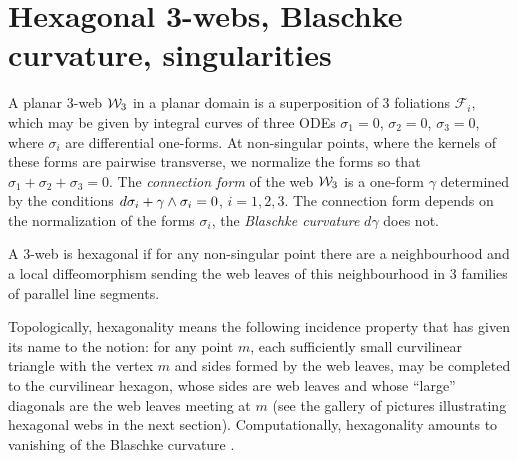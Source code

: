 \documentclass[11pt]{article}
\numberwithin{equation}{section}
\numberwithin{equation}{section}
\begin{document}
\section{Hexagonal 3-webs, Blaschke curvature, singularities}
A planar 3-web ${\cal W}_3$ in a planar domain is a superposition of 3 foliations $\mathcal{F}_i$, which may be given by integral curves of three ODEs
$
\sigma _1=0$, $\sigma _2=0$, $ \sigma _3=0$,
where $\sigma _i$ are differential one-forms. At non-singular points, where the kernels of these forms are pairwise transverse, we normalize the forms so that
$\sigma_1+\sigma_2+\sigma_3=0.$ The {\it connection form} of the web ${\cal W}_3$ is a one-form $\gamma$ determined by the conditions
${\rm d}\sigma_i+\gamma \wedge \sigma_i=0$, $i=1,2,3$.
The connection form depends on the normalization of the forms $\sigma_i$, the {\it Blaschke curvature} $d\gamma$ does not.
\begin{Definition}
A 3-web is hexagonal if for any non-singular point there are a neighbourhood and a local diffeomorphism sending the web leaves of this neighbourhood in 3 families of parallel line segments.
\end{Definition}
Topologically, hexagonality means the following incidence property that has given its name to the notion: for any point $m$, each sufficiently small curvilinear triangle with the vertex $m$ and sides formed by the web leaves, may be completed to the curvilinear hexagon, whose sides are web leaves and whose ``large'' diagonals are the web leaves meeting at $m$ (see the gallery of pictures illustrating hexagonal webs in the next section). Computationally, hexagonality amounts to vanishing of the Blaschke curvature \cite{BB-38}.
\end{document}
